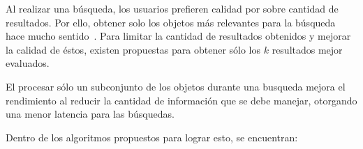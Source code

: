 


Al realizar una búsqueda, los usuarios prefieren calidad por sobre cantidad de
resultados. Por ello, obtener solo los objetos más relevantes para la
búsqueda hace mucho sentido~\citealt{oulasvirta2009more}. %
Para limitar la cantidad de resultados obtenidos y mejorar la calidad de éstos,
existen propuestas para obtener sólo los $k$ resultados mejor evaluados.

El procesar sólo un subconjunto de los objetos durante una busqueda mejora el
rendimiento al reducir la cantidad de información que se debe manejar, otorgando
una menor latencia para las búsquedas.

Dentro de los algoritmos propuestos para lograr esto, se encuentran:



%

